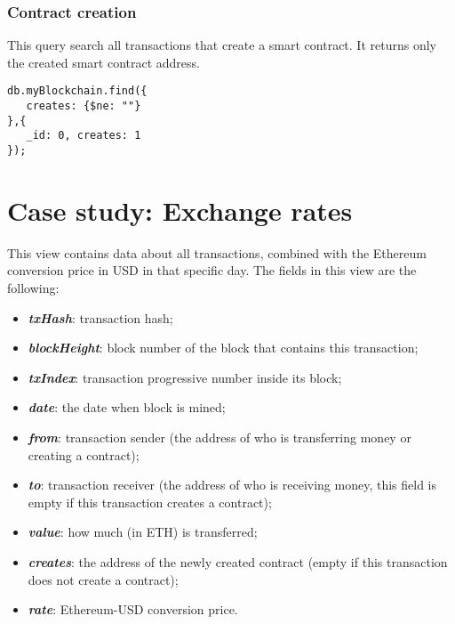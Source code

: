 \subsubsection{Contract creation}
This query search all transactions that create a smart contract. It returns only the created smart contract address. 
\begin{center}
\begin{varwidth}{\linewidth}
\begin{verbatim}
db.myBlockchain.find({
   creates: {$ne: ""}
},{
   _id: 0, creates: 1
});

\end{verbatim}
\end{varwidth}
\end{center}
\section{Case study: Exchange rates}
\label{exchangerates}
This view contains data about all transactions, combined with the Ethereum conversion price in USD in that specific day. 
The fields in this view are the following:
\begin{itemize}
    \item \textit{\textbf{txHash}}: transaction hash;
    \item \textit{\textbf{blockHeight}}: block number of the block that contains this transaction;
    \item \textit{\textbf{txIndex}}: transaction progressive number inside its block;
    \item \textit{\textbf{date}}: the date when block is mined;
    \item \textit{\textbf{from}}: transaction sender (the address of who is transferring money or creating a contract);
    \item \textit{\textbf{to}}: transaction receiver (the address of who is receiving money, this field is empty if this transaction creates a contract);
    \item \textit{\textbf{value}}: how much (in ETH) is transferred;
    \item \textit{\textbf{creates}}: the address of the newly created contract (empty if this transaction does not create a contract);
    \item \textit{\textbf{rate}}: Ethereum-USD conversion price.
\end{itemize}

